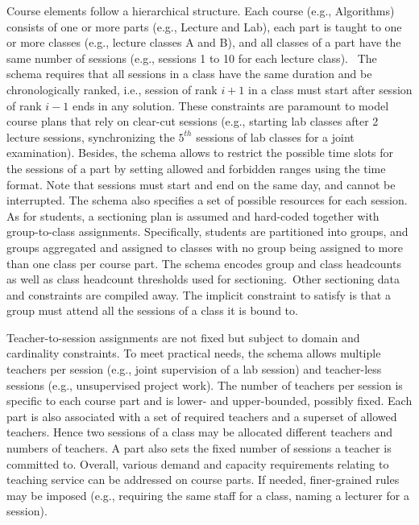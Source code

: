 \documentclass[runningheads]{llncs}
\begin{document}
Course elements follow a hierarchical structure.
Each course (e.g., Algorithms) consists of one or more parts (e.g., Lecture and Lab),
each part is taught to one or more classes (e.g., lecture classes A and B),
and all classes of a part have the same number of sessions (e.g., sessions 1 to 10 for each lecture class).
~The schema requires that all sessions in a class have the same duration
and be chronologically ranked,
i.e., session of rank $i+1$ in a class must start after session of rank $i-1$ ends in any solution.
These constraints are paramount to model course plans that rely on clear-cut sessions
(e.g., starting lab classes after 2 lecture sessions,
synchronizing the $5^{th}$ sessions of lab classes for a joint examination).
Besides, the schema allows to restrict the possible time slots for the sessions of a part
by setting allowed and forbidden ranges using the time format.
Note that 
sessions must start and end on the same day, and cannot be interrupted. The schema also specifies a set of possible resources for each session.
As for students, a sectioning plan
is assumed and hard-coded together with group-to-class assignments.
Specifically, 
students are partitioned into groups,
and groups aggregated and assigned to classes
with no group being assigned to more than one class per course part.
The schema encodes group and class headcounts
as well as class headcount thresholds used for sectioning.~Other sectioning data and constraints are compiled away.
The implicit constraint to satisfy is that a group must attend all the sessions of a class it is bound to.


Teacher-to-session assignments are not fixed
but subject to domain and cardinality constraints.
To meet practical needs, 
the schema allows multiple teachers per session
(e.g., joint supervision of a lab session) and teacher-less sessions 
(e.g., unsupervised project work).
The number of teachers per session is specific to each course part
and is lower- and upper-bounded, possibly fixed.
Each part is also associated with 
a set of required teachers
and a superset of allowed teachers.
Hence two sessions of a class may be allocated different teachers and numbers of teachers.
A part also sets the fixed number of sessions a teacher is committed to.
Overall, various demand and capacity requirements relating to teaching service 
can be addressed on course parts.
If needed, finer-grained rules may be imposed
(e.g., requiring the same staff for a class, naming a lecturer for a session).
\end{document}
